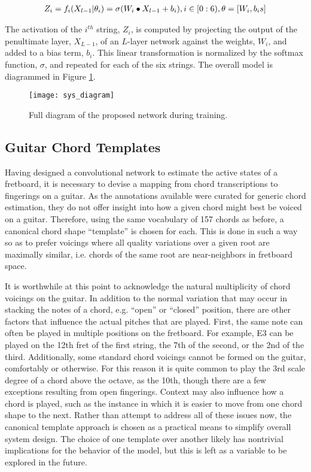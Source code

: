 \begin{align*}
\label{eq:softmax_layer}
\small
Z_i = f_i(X_{l-1} \vert \theta_i) = \sigma (W_i \bullet X_{l-1} + b_i), i \in [0:6), \theta = [W_i, b_is]
\end{align*}

\noindent The activation of the $i^{th}$ string, $Z_i$, is computed by projecting the output of the penultimate layer, $X_{L-1}$, of an $L$-layer network against the weights, $W_i$, and added to a bias term, $b_i$.
This linear transformation is normalized by the softmax function, $\sigma$, and repeated for each of the six strings.
The overall model is diagrammed in Figure \ref{fig:guitarnet}.

\begin{figure}[t!]
  \centering
  \centerline{\texttt{[image: sys\_diagram]}}
\caption{Full diagram of the proposed network during training.}
\label{fig:guitarnet}
%
\end{figure}


\subsection{Guitar Chord Templates}
\label{subsec:vocabulary}

Having designed a convolutional network to estimate the active states of a fretboard, it is necessary to devise a mapping from chord transcriptions to fingerings on a guitar.
As the annotations available were curated for generic chord estimation, they  do not offer insight into how a given chord might best be voiced on a guitar.
Therefore, using the same vocabulary of 157 chords as before, a canonical chord shape ``template'' is chosen for each.
This is done in such a way so as to prefer voicings where all quality variations over a given root are maximally similar, i.e. chords of the same root are near-neighbors in fretboard space.

It is worthwhile at this point to acknowledge the natural multiplicity of chord voicings on the guitar.
In addition to the normal variation that may occur in stacking the notes of a chord, e.g. ``open'' or ``closed'' position, there are other factors that influence the actual pitches that are played.
First, the same note can often be played in multiple positions on the fretboard.
For example, E3 can be played on the 12th fret of the first string, the 7th of the second, or the 2nd of the third.
Additionally, some standard chord voicings cannot be formed on the guitar, comfortably or otherwise.
For this reason it is quite common to play the 3rd scale degree of a chord above the octave, as the 10th, though there are a few exceptions resulting from open fingerings.
Context may also influence how a chord is played, such as the instance in which it is easier to move from one chord shape to the next.
Rather than attempt to address all of these issues now, the canonical template approach is chosen as a practical means to simplify overall system design.
The choice of one template over another likely has nontrivial implications for the behavior of the model, but this is left as a variable to be explored in the future.


